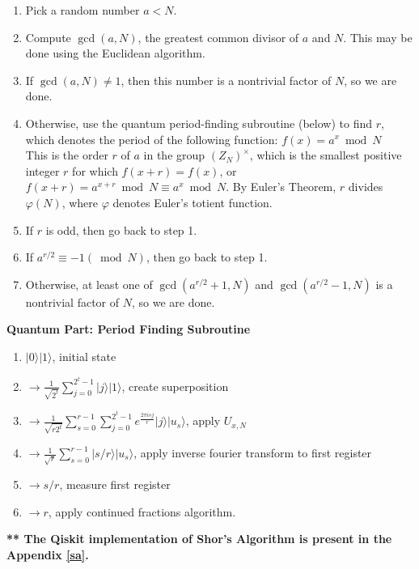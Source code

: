 \documentclass[12pt]{report}
\begin{document}
\begin{enumerate}
\item Pick a random number  $a<N$.
\item Compute $\gcd(a,N)$, the greatest common divisor of $a$ and $N$. This may be done using the Euclidean algorithm.
\item If $\gcd(a,N) \neq 1$, then this number is a nontrivial factor of $N$, so we are done.
\item Otherwise, use the quantum period-finding subroutine (below) to find $r$, which denotes the period of the following function: $ f(x)=a^{x} \bmod {N}$ \\
	 This is the order $r$ of $a$ in the group $({Z} _{N})^{\times }$, which is the smallest positive integer $r$ for which $f(x+r)=f(x)$, or $f(x+r)=a^{x+r}{\bmod {N}}\equiv a^{x}{\bmod {N}}$. By Euler's Theorem, $r$ divides $\varphi (N)$, where $\varphi$  denotes Euler's totient function.
\item If $r$ is odd, then go back to step 1.
\item If $a^{r/2}\equiv -1({\bmod {N}})$, then go back to step 1.
\item Otherwise, at least one of $\gcd(a^{r/2}+1,N)$ and $\gcd(a^{r/2}-1,N)$ is a nontrivial factor of $N$, so we are done.
\end{enumerate}
\textbf{Quantum Part: Period Finding Subroutine}
\begin{enumerate}
\item $|0\rangle |1\rangle$, initial state\\
\item $\to\frac{1}{\sqrt{2^t}}\sum_{j=0}^{2^t - 1} |j\rangle|1\rangle$, create superposition\\
\item $\to\frac{1}{\sqrt{r2^t}}\sum_{s=0}^{r - 1} \sum_{j=0}^{2^t - 1}  e^{\frac{2\pi isj}{r}} |j\rangle|u_s\rangle$,  apply $U_{x,N}$\\
\item $\to\frac{1}{\sqrt{r}}\sum_{s=0}^{r - 1}|s/r\rangle|u_s\rangle$, apply inverse fourier transform to first register\\
\item $\to s/r$, measure first register\\
\item $\to r$, apply continued fractions algorithm.
\end{enumerate}
\textbf{** The Qiskit implementation of Shor's Algorithm is present in the Appendix \ref{sa}.}

\end{document}
